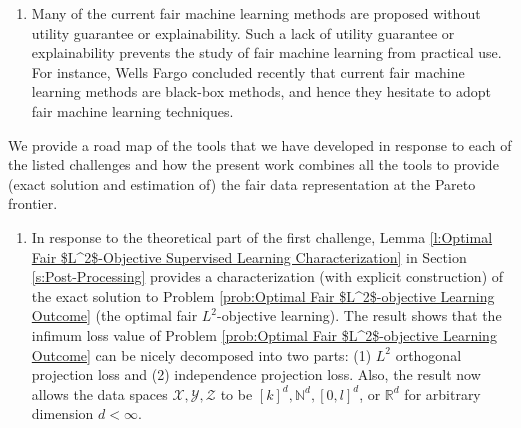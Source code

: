 \documentclass[twoside,11pt]{article}
\begin{document}
\begin{enumerate}
\item Many of the current fair machine learning methods are proposed without utility guarantee or explainability. Such a lack of utility guarantee or explainability prevents the study of fair machine learning from practical use. For instance, Wells Fargo \cite{zhou2021bias} concluded recently that current fair machine learning methods are black-box methods, and hence they hesitate to adopt fair machine learning techniques.
\end{enumerate}

We provide a road map of the tools that we have developed in response to each of the listed challenges and how the present work combines all the tools to provide (exact solution and estimation of) the fair data representation at the Pareto frontier.

\begin{enumerate}
\item In response to the theoretical part of the first challenge, Lemma \ref{l:Optimal Fair $L^2$-Objective Supervised Learning Characterization} in Section \ref{s:Post-Processing} provides a characterization (with explicit construction) of the exact solution to Problem \ref{prob:Optimal Fair $L^2$-objective Learning Outcome} (the optimal fair $L^2$-objective learning). The result shows that the infimum loss value of Problem \ref{prob:Optimal Fair $L^2$-objective Learning Outcome} can be nicely decomposed into two parts: (1) $L^2$ orthogonal projection loss and (2) independence projection loss. Also, the result now allows the data spaces $\mathcal{X}, \mathcal{Y}, \mathcal{Z}$ to be $[k]^d, \mathbb{N}^d, [0,l]^d$, or $\mathbb{R}^d$ for arbitrary dimension $d < \infty$. 


\end{enumerate}
\end{document}

